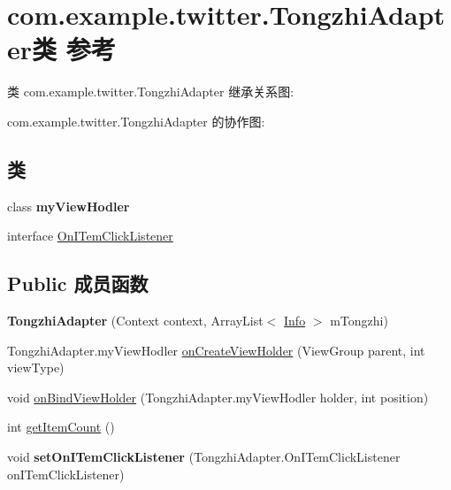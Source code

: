 \hypertarget{classcom_1_1example_1_1twitter_1_1_tongzhi_adapter}{}\section{com.\+example.\+twitter.\+Tongzhi\+Adapter类 参考}
\label{classcom_1_1example_1_1twitter_1_1_tongzhi_adapter}


类 com.\+example.\+twitter.\+Tongzhi\+Adapter 继承关系图\+:


com.\+example.\+twitter.\+Tongzhi\+Adapter 的协作图\+:
\subsection*{类}
\begin{DoxyCompactItemize}
\item 
class {\bfseries my\+View\+Hodler}
\item 
interface \mbox{\hyperlink{interfacecom_1_1example_1_1twitter_1_1_tongzhi_adapter_1_1_on_i_tem_click_listener}{On\+I\+Tem\+Click\+Listener}}
\end{DoxyCompactItemize}
\subsection*{Public 成员函数}
\begin{DoxyCompactItemize}
\item 
\mbox{\label{classcom_1_1example_1_1twitter_1_1_tongzhi_adapter_ab21d49787eca5a1dc8b52724475f39ff}} 
{\bfseries Tongzhi\+Adapter} (Context context, Array\+List$<$ \mbox{\hyperlink{classcom_1_1example_1_1twitter_1_1_info}{Info}} $>$ m\+Tongzhi)
\item 
Tongzhi\+Adapter.\+my\+View\+Hodler \mbox{\hyperlink{classcom_1_1example_1_1twitter_1_1_tongzhi_adapter_a27f962280b61a7b2e67ab90a441fbdfe}{on\+Create\+View\+Holder}} (View\+Group parent, int view\+Type)
\item 
void \mbox{\hyperlink{classcom_1_1example_1_1twitter_1_1_tongzhi_adapter_a3922bd9868dba1654ae1b01064cf9830}{on\+Bind\+View\+Holder}} (Tongzhi\+Adapter.\+my\+View\+Hodler holder, int position)
\item 
int \mbox{\hyperlink{classcom_1_1example_1_1twitter_1_1_tongzhi_adapter_a461f1e93bcb29b8a97fa3acffe52c959}{get\+Item\+Count}} ()
\item 
\mbox{\label{classcom_1_1example_1_1twitter_1_1_tongzhi_adapter_a9936ad2a533a8fa086d28d268c6a8502}} 
void {\bfseries set\+On\+I\+Tem\+Click\+Listener} (Tongzhi\+Adapter.\+On\+I\+Tem\+Click\+Listener on\+I\+Tem\+Click\+Listener)
\end{DoxyCompactItemize}


